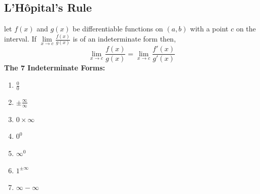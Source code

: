\documentclass[14pt]{article}
\begin{document}
    \subsection{L'H\^{o}pital's Rule}
    let $f(x)$ and $g(x)$ be differentiable functions on $(a,b)$ with a
    point $c$ on the interval. If $\lim \limits_{x\rightarrow
    c}\frac{f(x)}{g(x)}$ is of an indeterminate form then,
    $$\lim \limits_{x \rightarrow c}\frac{f(x)}{g(x)}=\lim \limits_{x
    \rightarrow c}\frac{f'(x)}{g'(x)}$$ \textbf{The 7 Indeterminate
    Forms:}\\
    \begin{enumerate}
        \item $\frac{0}{0}$
        \item $\pm\frac{\infty}{\infty}$
        \item $0\times\infty$
        \item $0^0$
        \item $\infty^0$
        \item $1^{\pm\infty}$
        \item $\infty-\infty$
    \end{enumerate}
\end{document}
